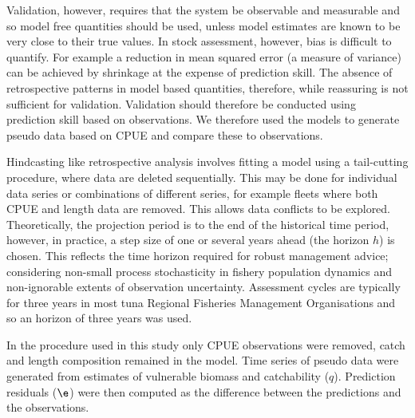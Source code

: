 \documentclass[12pt,halfline,a4paper,nonumbib]{ouparticle}
\begin{document}
Validation, however, requires that the system be observable and measurable and so model free quantities should be used, unless model estimates are known to be very close to their true values. In stock assessment, however, bias is difficult to quantify. For example a reduction in mean squared error (a measure of variance) can be achieved by shrinkage at the expense of prediction skill. The absence of retrospective patterns in model based quantities, therefore, while reassuring is not sufficient for validation. Validation should therefore be conducted using prediction skill based on observations. We therefore used the models to generate pseudo data based on CPUE and compare these to observations. 

Hindcasting like retrospective analysis involves fitting a model using a tail-cutting procedure, where data are deleted sequentially. This may be done for individual data series or combinations of different series, for example fleets where both CPUE and length data are removed. This allows data conflicts to be explored. Theoretically, the projection period is to the end of the historical time period, however, in practice, a step size of one or several years ahead (the horizon $h$) is chosen. This reflects the time horizon required for robust management advice; considering non-small process stochasticity in fishery population dynamics and non-ignorable extents of observation uncertainty. 
Assessment cycles are typically for three years in most tuna Regional Fisheries Management Organisations and so an horizon of three years was used.

In the procedure used in this study only CPUE observations were removed, catch and length composition remained in the model. Time series of pseudo data were generated from estimates of vulnerable biomass and catchability ($q$). Prediction residuals ($\e$) were then computed as the difference between the predictions and the observations. %
\end{document}
